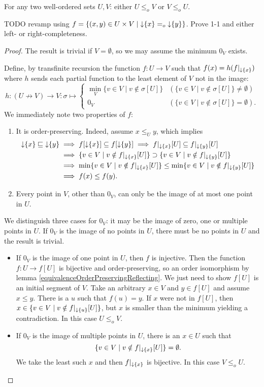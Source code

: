\begin{theorem}\label{comparabilityWosets}
For any two well-ordered sets $U,V$: either $U\leq_o V$ or $V\leq_o U$.
\end{theorem}
TODO revamp using $f = \left\{ (x,y)\in U\times V \;\middle|\; \operatorname{\downarrow}\{x\} =_o \operatorname{\downarrow}\{y\} \right\}$. Prove 1-1 and either left- or right-completeness.
\begin{proof}
The result is trivial if $V=\emptyset$, so we may assume the minimum $0_V$ exists.

Define, by transfinite recursion the function $f:U\to V$ such that $f(x) = h(f|_{\operatorname{\downarrow}\{x\}})$ where $h$ sends each partial function to the least element of $V$ not in the image:
\[ h: (U\not\to V) \to V: \sigma \mapsto \begin{cases}
\min_V\{v\in V\;|\; v\notin \sigma[U]\} & (\{v\in V\;|\; v\notin \sigma[U]\} \neq \emptyset) \\
0_V  & (\{v\in V\;|\; v\notin \sigma[U]\} = \emptyset).
\end{cases} \]
We immediately note two properties of $f$:
\begin{enumerate}
\item It is order-preserving. Indeed, assume $x\leq_U y$, which implies
\begin{align*}
\operatorname{\downarrow}\{x\} \sqsubseteq \operatorname{\downarrow}\{y\} &\implies f[\operatorname{\downarrow}\{x\}] \subseteq f[\operatorname{\downarrow}\{y\}] \implies f|_{\operatorname{\downarrow}\{x\}}[U] \subseteq f|_{\operatorname{\downarrow}\{y\}}[U] \\
&\implies \{v\in V\;|\; v\notin f|_{\operatorname{\downarrow}\{x\}}[U]\} \supset \{v\in V\;|\; v\notin f|_{\operatorname{\downarrow}\{y\}}[U]\} \\
&\implies \min\{v\in V\;|\; v\notin f|_{\operatorname{\downarrow}\{x\}}[U]\} \leq \min\{v\in V\;|\; v\notin f|_{\operatorname{\downarrow}\{y\}}[U]\} \\ &\implies f(x) \leq f(y).
\end{align*}
\item Every point in $V$, other than $0_V$, can only be the image of at most one point in $U$.
\end{enumerate}
We distinguish three cases for $0_V$: it may be the image of zero, one or multiple points in $U$. If $0_V$ is the image of no points in $U$, there must be no points in $U$ and the result is trivial.
\begin{itemize}
\item If $0_V$ is the image of one point in $U$, then $f$ is injective. Then the function $f: U\to f[U]$ is bijective and order-preserving, so an order isomorphism by lemma \ref{equivalenceOrderPreservingReflecting}. We just need to show $f[U]$ is an initial segment of $V$. Take an arbitrary $x\in V$ and $y\in f[U]$ and assume $x\leq y$. There is a $u$ such that $f(u) = y$. If $x$ were not in $f[U]$, then $x\in\{v\in V\;|\; v\notin f|_{\operatorname{\downarrow}\{u\}}[U]\}$, but $x$ is smaller than the minimum yielding a contradiction. In this case $U\leq_o V$.
\item If $0_V$ is the image of multiple points in $U$, there is an $x\in U$ such that
\[ \{v\in V\;|\; v\notin f|_{\operatorname{\downarrow}\{x\}}[U]\} = \emptyset. \]
We take the least such $x$ and then $f|_{\operatorname{\downarrow}\{x\}}$ is bijective. In this case $V \leq_o U$.
\end{itemize}
\end{proof}
